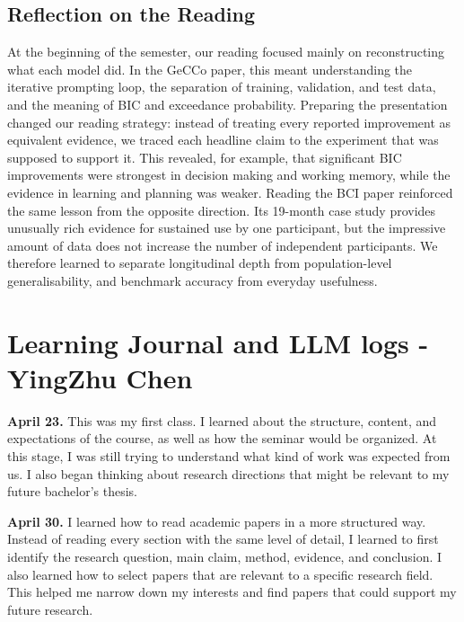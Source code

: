 \subsection{Reflection on the Reading}
At the beginning of the semester, our reading focused mainly on reconstructing what each model did. In the GeCCo paper, this meant understanding the iterative prompting loop, the separation of training, validation, and test data, and the meaning of BIC and exceedance probability. Preparing the presentation changed our reading strategy: instead of treating every reported improvement as equivalent evidence, we traced each headline claim to the experiment that was supposed to support it. This revealed, for example, that significant BIC improvements were strongest in decision making and working memory, while the evidence in learning and planning was weaker. Reading the BCI paper reinforced the same lesson from the opposite direction. Its 19-month case study provides unusually rich evidence for sustained use by one participant, but the impressive amount of data does not increase the number of independent participants. We therefore learned to separate longitudinal depth from population-level generalisability, and benchmark accuracy from everyday usefulness.



 
\appendix
 
\section{Learning Journal and LLM logs - YingZhu Chen}
 
\textbf{April 23.} This was my first class. I learned about the structure, content, and expectations of the course, as well as how the seminar would be organized. At this stage, I was still trying to understand what kind of work was expected from us. I also began thinking about research directions that might be relevant to my future bachelor's thesis.
 
\textbf{April 30.} I learned how to read academic papers in a more structured way. Instead of reading every section with the same level of detail, I learned to first identify the research question, main claim, method, evidence, and conclusion. I also learned how to select papers that are relevant to a specific research field. This helped me narrow down my interests and find papers that could support my future research.
 
